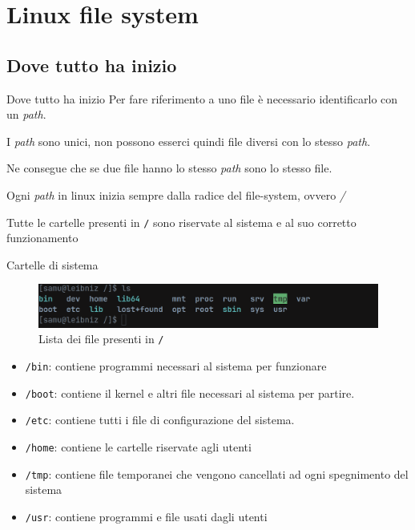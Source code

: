 \documentclass{beamer}
\begin{document}
\section{Linux file system}

\subsection{Dove tutto ha inizio}
\begin{frame}{Dove tutto ha inizio}
  Per fare riferimento a uno file è necessario identificarlo con un 
  \textit{path}. \bigskip

  I \textit{path} sono unici, non possono esserci quindi file diversi con lo 
  stesso \textit{path}. \bigskip

  Ne consegue che se due file hanno lo stesso \textit{path} sono lo stesso file.
  \bigskip

  Ogni \textit{path} in linux inizia sempre dalla radice del file-system, ovvero
  \textit{/}\bigskip

  Tutte le cartelle presenti in \texttt{/} sono riservate al sistema e al suo
  corretto funzionamento
\end{frame}

\begin{frame}{Cartelle di sistema}
  \begin{figure}
    \includegraphics[width=\textwidth]{assets/rootfs-ls.png}
    \caption{Lista dei file presenti in \texttt{/}}
  \end{figure}
  \begin{itemize}
    \item \texttt{/bin}: contiene programmi necessari al sistema per funzionare
    \item \texttt{/boot}: contiene il kernel e altri file necessari al sistema
      per partire.
    \item \texttt{/etc}: contiene tutti i file di configurazione del sistema.
    \item \texttt{/home}: contiene le cartelle riservate agli utenti
    \item \texttt{/tmp}: contiene file temporanei che vengono cancellati ad ogni
      spegnimento del sistema
    \item \texttt{/usr}: contiene programmi e file usati dagli utenti
  \end{itemize}
\end{frame}
\end{document}
